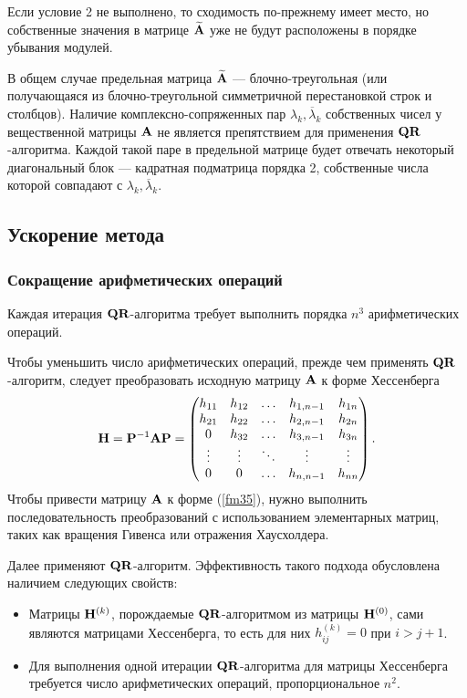 \documentclass[12pt]{article}
\begin{document}
	Если условие 2 не выполнено, то сходимость по-прежнему имеет место, но собственные значения в матрице $\widetilde{\bold{A}}$ уже не будут расположены в порядке убывания модулей.
	
	В общем случае предельная матрица $\widetilde{\bold{A}}$ --- блочно-треугольная (или получающаяся из блочно-треугольной симметричной перестановкой строк и столбцов). Наличие комплексно-сопряженных пар $\lambda_k, \overline{\lambda}_k$ собственных чисел у вещественной матрицы $\bold{A}$ не является препятствием для применения $\bold{QR}$-алгоритма. Каждой такой паре в предельной матрице будет отвечать некоторый диагональный блок --- кадратная подматрица порядка 2, собственные числа которой совпадают с $\lambda_k, \overline{\lambda}_k$.
	
	\subsection*{Ускорение метода}
	
	\subsubsection*{Сокращение арифметических операций}
	
	Каждая итерация $\bold{QR}$-алгоритма требует выполнить порядка $n^3$ арифметических операций.
	
	Чтобы уменьшить число арифметических операций, прежде чем применять $\bold{QR}$-алгоритм, следует преобразовать исходную матрицу $\bold{A}$ к форме Хессенберга
	\begin{equation}
		\bold{H}=\bold{P}^{-1}\bold{AP}=\begin{pmatrix}
			h_{11} & h_{12} & \ldots & h_{1,n-1} & h_{1n} \\
			h_{21} & h_{22} & \ldots & h_{2,n-1} & h_{2n} \\
			0      & h_{32} & \ldots & h_{3,n-1} & h_{3n} \\
			\vdots & \vdots & \ddots  & \vdots    & \vdots \\
			0      & 0      & \ldots & h_{n,n-1} & h_{nn}
		\end{pmatrix}.\label{fm35}
	\end{equation}
	Чтобы привести матрицу $\bold{A}$ к форме (\ref{fm35}), нужно выполнить последовательность преобразований с использованием элементарных матриц, таких как вращения Гивенса или отражения Хаусхолдера.
	
	Далее применяют $\bold{QR}$-алгоритм. Эффективность такого подхода обусловлена наличием следующих свойств:
	\begin{itemize}
		\item Матрицы $\bold{H}^{\left(k\right)}$, порождаемые $\bold{QR}$-алгоритмом из матрицы $\bold{H}^{\left(0\right)}$, сами являются матрицами Хессенберга, то есть для них $h_{ij}^{\left(k\right)}=0$ при $i>j+1$.
		\item Для выполнения одной итерации $\bold{QR}$-алгоритма для матрицы Хессенберга требуется число арифметических операций, пропорциональное $n^2$.
	\end{itemize}
	
\end{document}
